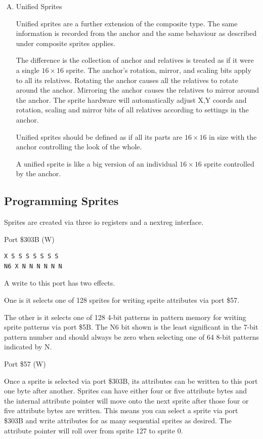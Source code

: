 \begin{enumerate}[A.]
\item Unified Sprites

  Unified sprites are a further extension of the
  composite type. The same information is recorded from the anchor and
  the same behaviour as described under composite sprites applies.

  The difference is the collection of anchor and relatives is treated
  as if it were a single $16\times16$ sprite. The anchor’s rotation,
  mirror, and scaling bits apply to all its relatives. Rotating the
  anchor causes all the relatives to rotate around the
  anchor. Mirroring the anchor causes the relatives to mirror around
  the anchor. The sprite hardware will automatically adjust X,Y coords
  and rotation, scaling and mirror bits of all relatives according to
  settings in the anchor.

  Unified sprites should be defined as if all its parts are
  $16\times16$ in size with the anchor controlling the look of the
  whole.

  A unified sprite is like a big version of an individual $16\times16$
  sprite controlled by the anchor.
\end{enumerate}

\subsection{Programming Sprites}

Sprites are created via three io registers and a nextreg interface.

Port \$303B (W)
\begin{verbatim}
X S S S S S S S
N6 X N N N N N N
\end{verbatim}
A write to this port has two effects.

One is it selects one of 128 sprites for writing sprite attributes via
port \$57.

The other is it selects one of 128 4-bit patterns in pattern memory
for writing sprite patterns via port \$5B. The N6 bit shown is the
least significant in the 7-bit pattern number and should always be
zero when selecting one of 64 8-bit patterns indicated by N.

Port \$57 (W)

Once a sprite is selected via port \$303B, its attributes can be
written to this port one byte after another. Sprites can have either
four or five attribute bytes and the internal attribute pointer will
move onto the next sprite after those four or five attribute bytes are
written. This means you can select a sprite via port \$303B and write
attributes for as many sequential sprites as desired. The attribute
pointer will roll over from sprite 127 to sprite 0.

